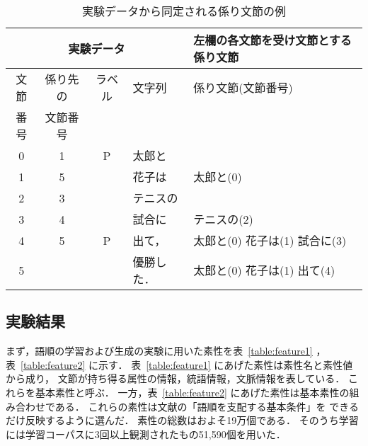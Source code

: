   \begin{table*}[htbp]
    \begin{center}
      \caption{実験データから同定される係り文節の例}
      \label{table:kakari_bunsetsu}
      \leavevmode
      \renewcommand{\arraystretch}{}
      \begin{tabular}[c]{|c|c|c|l||l|}
        \hline
        \multicolumn{4}{|c||}{実験データ} 
        & 左欄の各文節を受け文節とする係り文節\\
        \hline
        文節 & 係り先の & ラベル & 文字列 & 係り文節(文節番号) \\
        番号 & 文節番号 & & & \\
        \hline
        0 & 1 & P & 太郎と & \\
        1 & 5 &   & 花子は & 太郎と(0)\\
        2 & 3 &   & テニスの & \\
        3 & 4 &   & 試合に & テニスの(2)\\
        4 & 5 & P & 出て， & 太郎と(0) 花子は(1) 試合に(3)\\
        5 &   &   & 優勝した．& 太郎と(0) 花子は(1) 出て(4)\\
        \hline
      \end{tabular}
    \end{center}
  \end{table*}

\subsection{実験結果}
\label{sec:exp_result}

まず，語順の学習および生成の実験に用いた素性を表~\ref{table:feature1} ，
表~\ref{table:feature2} に示す．
表~\ref{table:feature1} にあげた素性は素性名と素性値から成り，
文節が持ち得る属性の情報，統語情報，文脈情報を表している．
これらを基本素性と呼ぶ．
一方，表~\ref{table:feature2} にあげた素性は基本素性の組み合わせである．
これらの素性は文献\cite{Saeki:98}の「語順を支配する基本条件」を
できるだけ反映するように選んだ．
素性の総数はおよそ19万個である．
そのうち学習には学習コーパスに3回以上観測されたもの51,590個を用いた．

